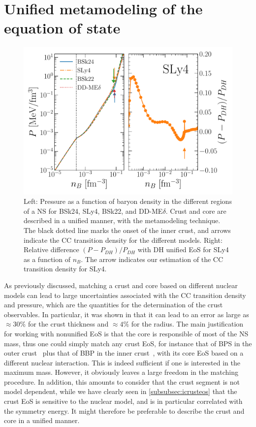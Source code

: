 
\section{Unified metamodeling of the equation of state}\label{sec:mmeos}

\begin{figure}[!t]
\begin{center}
  \includegraphics[width=0.9\linewidth]{figures/unified.pdf}
\end{center}
\caption[Unified metamodeling of the equation of state]{Left: Pressure as a
function of baryon density in the different regions of a NS for BSk24, SLy4,
BSk22, and DD-ME$\delta$. Crust and core are described in a unified manner, 
with the metamodeling technique. The black dotted line marks the onset of the 
inner crust, and arrows indicate the CC transition density for the
different models. Right: Relative difference $(P - P_{DH})/P_{DH}$ with 
DH unified EoS for SLy4~\cite{Douchin2001} as a function 
of $n_B$. The arrow indicates our estimation of the CC transition 
density for SLy4.}\label{fig:unified}
\end{figure}

As previously discussed, matching a crust and core based on different nuclear
models can lead to large uncertainties associated with the CC transition
density and pressure, which are the quantities for the determination of the
crust observables. In particular, it was shown in \cite{Fortin2016} that it 
can lead to an error as large as $\approx 30\%$ for the crust thickness and
$\approx 4\%$ for the radius. The main justification for working with nonunified 
EoS is that the core is responsible of most of the NS mass, thus one could 
simply match any crust EoS, for instance that of BPS in the outer 
crust~\cite{BPS} plus that of BBP in the inner crust~\cite{BBP}, 
with its core EoS based on a different nuclear interaction. This is indeed 
sufficient if one is interested in the maximum mass. However, it obviously 
leaves a large freedom in the matching procedure. In addition, this amounts to 
consider that the crust segment is not model dependent, while we have clearly 
seen in \ref{subsubsec:icrusteos} that the crust EoS is sensitive to the 
nuclear model, and is in particular correlated with the symmetry energy. It 
might therefore be preferable to describe the crust and core in a unified 
manner.

